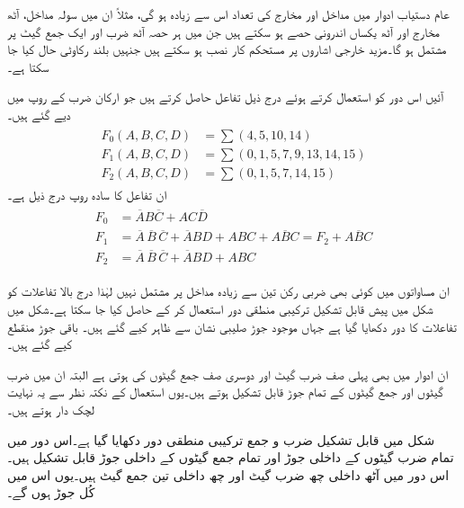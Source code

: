 عام دستیاب ادوار میں مداخل اور مخارج کی تعداد اس سے زیادہ ہو گی، مثلاً ان میں سولہ مداخل، آٹھ مخارج اور آٹھ یکساں اندرونی حصے ہو سکتے ہیں جن میں ہر حصہ آٹھ ضرب اور ایک جمع گیٹ پر مشتمل ہو گا۔مزید خارجی اشاروں پر مستحکم کار نصب ہو سکتے ہیں جنہیں بلند رکاوٹی حال کیا جا سکتا ہے۔

آئیں اس دور کو استعمال کرتے ہوئے درج ذیل تفاعل حاصل کرتے ہیں جو ارکان ضرب کے روپ میں دیے گئے ہیں۔
\begin{gather}
\begin{aligned}
F_0(A,B,C,D)&=\sum(4,5,10,14)\\
F_1(A,B,C,D)&=\sum(0,1,5,7,9,13,14,15)\\
F_2(A,B,C,D)&=\sum(0,1,5,7,14,15)
\end{aligned}
\end{gather}
ان تفاعل کا سادہ روپ درج ذیل ہے۔
\begin{gather}
\begin{aligned}
F_0&=\overline{A}B\overline{C}+AC\overline{D}\\
F_1&=\overline{A}\,\overline{B}\,\overline{C}+\overline{A}BD+ABC+A\overline{B}C=F_2+A\overline{B}C\\
F_2&=\overline{A}\,\overline{B}\,\overline{C}+\overline{A}BD+ABC
\end{aligned}
\end{gather}

ان مساواتوں میں کوئی بھی ضربی رکن تین سے زیادہ مداخل پر مشتمل نہیں لہٰذا درج بالا تفاعلات کو شکل  میں پیش قابل تشکیل ترکیبی منطقی دور استعمال کر کے حاصل کیا جا سکتا ہے۔شکل  میں تفاعلات کا دور دکھایا گیا ہے جہاں موجود جوڑ صلیبی نشان سے ظاہر کیے گئے ہیں۔ باقی جوڑ منقطع کیے گئے ہیں۔


ان ادوار میں بھی پہلی صف ضرب گیٹ اور دوسری صف جمع گیٹوں کی ہوتی ہے البتہ ان میں ضرب گیٹوں اور جمع گیٹوں کے تمام جوڑ قابل تشکیل ہوتے ہیں۔یوں استعمال کے نکتہ نظر سے یہ نہایت لچک دار ہوتے ہیں۔ 


شکل میں قابل تشکیل ضرب و جمع ترکیبی منطقی دور دکھایا گیا ہے۔اس دور میں تمام ضرب گیٹوں کے داخلی جوڑ اور تمام جمع گیٹوں کے داخلی جوڑ قابل تشکیل ہیں۔اس دور میں آٹھ داخلی چھ ضرب گیٹ اور چھ داخلی تین جمع گیٹ ہیں۔یوں اس میں کُل جوڑ  ہوں گے۔


